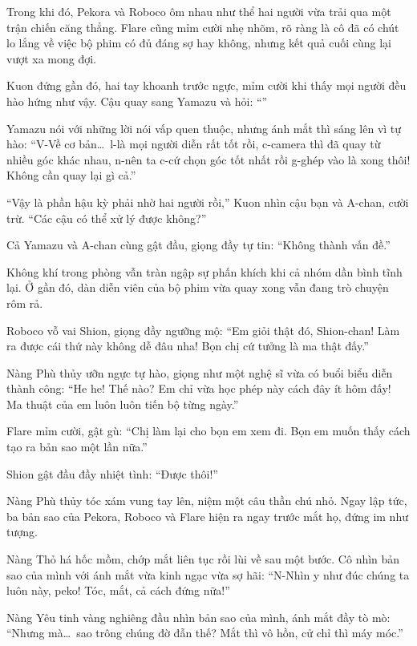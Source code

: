 \documentclass[../main.tex]{subfiles}
\begin{document}
Trong khi đó, Pekora và Roboco ôm nhau như thể hai người vừa trải qua một trận chiến căng thẳng. Flare cũng mỉm cười nhẹ nhõm, rõ ràng là cô đã có chút lo lắng về việc bộ phim có đủ đáng sợ hay không, nhưng kết quả cuối cùng lại vượt xa mong đợi.

Kuon đứng gần đó, hai tay khoanh trước ngực, mỉm cười khi thấy mọi người đều hào hứng như vậy. Cậu quay sang Yamazu và hỏi: ``''

Yamazu nói với những lời nói vấp quen thuộc, nhưng ánh mắt thì sáng lên vì tự hào: ``V-Về cơ bản\dots\ l-là mọi người diễn rất tốt rồi, c-camera thì đã quay từ nhiều góc khác nhau, n-nên ta c-cứ chọn góc tốt nhất rồi g-ghép vào là xong thôi! Không cần quay lại gì cả.''

``Vậy là phần hậu kỳ phải nhờ hai người rồi,'' Kuon nhìn cậu bạn và A-chan, cười trừ. ``Các cậu có thể xử lý được không?''

Cả Yamazu và A-chan cùng gật đầu, giọng đầy tự tin: ``Không thành vấn đề.''

Không khí trong phòng vẫn tràn ngập sự phấn khích khi cả nhóm dần bình tĩnh lại. Ở gần đó, dàn diễn viên của bộ phim vừa quay xong vẫn đang trò chuyện rôm rả.

Roboco vỗ vai Shion, giọng đầy ngưỡng mộ: ``Em giỏi thật đó, Shion-chan! Làm ra được cái thứ này không dễ đâu nha! Bọn chị cứ tưởng là ma thật đấy.''

Nàng Phù thủy ưỡn ngực tự hào, giọng như một nghệ sĩ vừa có buổi biểu diễn thành công: ``He he! Thế nào? Em chỉ vừa học phép này cách đây ít hôm đấy! Ma thuật của em luôn luôn tiến bộ từng ngày.''

Flare mỉm cười, gật gù: ``Chị làm lại cho bọn em xem đi. Bọn em muốn thấy cách tạo ra bản sao một lần nữa.''

Shion gật đầu đầy nhiệt tình: ``Được thôi!''

Nàng Phù thủy tóc xám vung tay lên, niệm một câu thần chú nhỏ. Ngay lập tức, ba bản sao của Pekora, Roboco và Flare hiện ra ngay trước mắt họ, đứng im như tượng.

Nàng Thỏ há hốc mồm, chớp mắt liên tục rồi lùi về sau một bước. Cô nhìn bản sao của mình với ánh mắt vừa kinh ngạc vừa sợ hãi: ``N-Nhìn y như đúc chúng ta luôn này, peko! Tóc, mắt, cả cách đứng nữa!''

Nàng Yêu tinh vàng nghiêng đầu nhìn bản sao của mình, ánh mắt đầy tò mò: ``Nhưng mà\dots\ sao trông chúng đờ đẫn thế? Mắt thì vô hồn, cử chỉ thì máy móc.''
\end{document}

